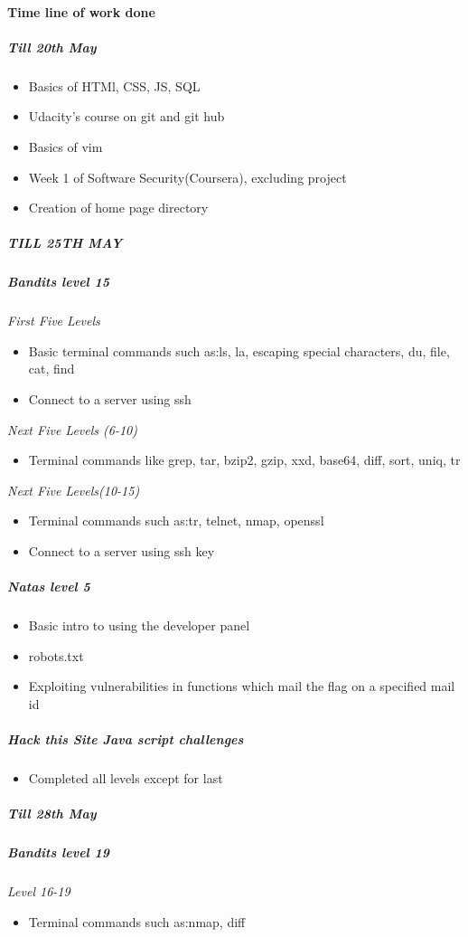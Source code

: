 \documentclass{article}
\begin{document}
\paragraph{Time line of work done}
\subparagraph{\textit{Till 20th May}}
    \begin{itemize}
    \item Basics of HTMl, CSS, JS, SQL 
    \item Udacity's course on git and git hub 
    \item Basics of vim 
    \item Week 1 of Software Security(Coursera), excluding project 
    \item Creation of home page directory
    \end{itemize}
\subparagraph{\textit{TILL 25TH MAY}}
\subparagraph{Bandits level 15}
    \textit{First Five Levels}
    \begin{itemize}
    \item Basic terminal commands such as:ls, la, escaping special characters, du, file, cat, find
    \item Connect to a server using ssh
    \end{itemize}
    \textit{Next Five Levels (6-10)}
    \begin{itemize}
    \item Terminal commands like grep, tar, bzip2, gzip, xxd, base64, diff, sort, uniq, tr
    \end{itemize}
    \textit{Next Five Levels(10-15)}
    \begin{itemize}
    \item Terminal commands such as:tr, telnet, nmap, openssl
    \item Connect to a server using ssh key
    \end{itemize}
\subparagraph{Natas level 5}
    \begin{itemize}
    \item Basic intro to using the developer panel
    \item robots.txt
    \item Exploiting vulnerabilities in functions which mail the flag on a specified mail id
    \end{itemize}    
\subparagraph{Hack this Site Java script challenges}
    \begin{itemize}
    \item Completed all levels except for last
    \end{itemize}    
    
\subparagraph{\textit{Till 28th May}}
\subparagraph{Bandits level 19}
    \textit{Level 16-19}
    \begin{itemize}
    \item Terminal commands such as:nmap, diff
    \end{itemize}
    
\end{document}
